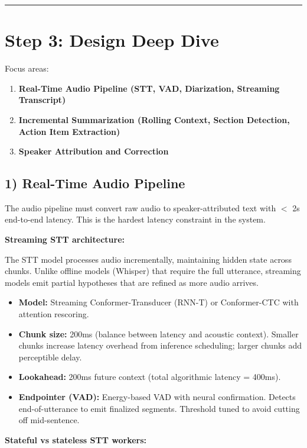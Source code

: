 \bigskip\hrule\bigskip

\section*{Step 3: Design Deep Dive}

Focus areas:

\begin{enumerate}
  \item \textbf{Real-Time Audio Pipeline (STT, VAD, Diarization, Streaming Transcript)}
  \item \textbf{Incremental Summarization (Rolling Context, Section Detection, Action Item Extraction)}
  \item \textbf{Speaker Attribution and Correction}
\end{enumerate}

\subsection*{1) Real-Time Audio Pipeline}

The audio pipeline must convert raw audio to speaker-attributed text with $<$ 2s end-to-end latency. This is the hardest latency constraint in the system.

\textbf{Streaming STT architecture:}

The STT model processes audio incrementally, maintaining hidden state across chunks. Unlike offline models (Whisper) that require the full utterance, streaming models emit partial hypotheses that are refined as more audio arrives.

\begin{itemize}
  \item \textbf{Model:} Streaming Conformer-Transducer (RNN-T) or Conformer-CTC with attention rescoring.
  \item \textbf{Chunk size:} 200ms (balance between latency and acoustic context). Smaller chunks increase latency overhead from inference scheduling; larger chunks add perceptible delay.
  \item \textbf{Lookahead:} 200ms future context (total algorithmic latency = 400ms).
  \item \textbf{Endpointer (VAD):} Energy-based VAD with neural confirmation. Detects end-of-utterance to emit finalized segments. Threshold tuned to avoid cutting off mid-sentence.
\end{itemize}

\textbf{Stateful vs stateless STT workers:}

